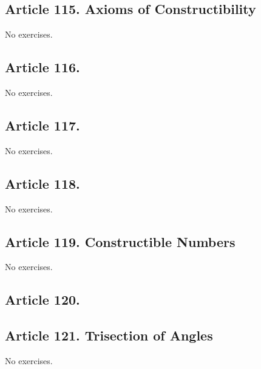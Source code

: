\subsection{Article 115. Axioms of Constructibility}

No exercises.
\subsection{Article 116.}

No exercises.
\subsection{Article 117.}

No exercises.
\subsection{Article 118.}

No exercises.
\subsection{Article 119. Constructible Numbers}

No exercises.
\subsection{Article 120.}

\subsection{Article 121. Trisection of Angles}

No exercises.

